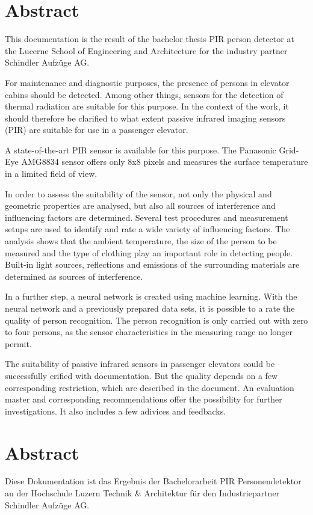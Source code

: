 \chapter*{Abstract}
\label{chap:abstract_englisch}
This documentation is the result of the bachelor thesis PIR person detector at the Lucerne School of Engineering and Architecture for the industry partner Schindler Aufzüge AG.

For maintenance and diagnostic purposes, the presence of persons in elevator cabins should be detected. Among other things, sensors for the detection of thermal radiation are suitable for this purpose. In the context of the work, it should therefore be clarified to what extent passive infrared imaging sensors (PIR) are suitable for use in a passenger elevator. 

A state-of-the-art PIR sensor is available for this purpose. The Panasonic Grid-Eye AMG8834 sensor offers only 8x8 pixels and measures the surface temperature in a limited field of view.  

In order to assess the suitability of the sensor, not only the physical and geometric properties are analysed, but also all sources of interference and influencing factors are determined. Several test procedures and measurement setups are used to identify and rate a wide variety of influencing factors. The analysis shows that the ambient temperature, the size of the person to be measured and the type of clothing play an important role in detecting people. Built-in light sources, reflections and emissions of the surrounding materials are determined as sources of interference.  

In a further step, a neural network is created using machine learning. With the  neural network and a previously prepared data sets, it is possible to a rate the quality of person recognition. The person recognition is only carried out with zero to four persons, as the sensor characteristics in the measuring range no longer permit. 

The suitability of passive infrared sensors in passenger elevators could be successfully erified with documentation. But the quality depends on a few corresponding restriction, which are described in the document. An evaluation master and corresponding recommendations offer the possibility for further investigations. It also includes a few adivices and feedbacks. 


\chapter*{Abstract}
\label{chap:abstract_german}
Diese Dokumentation ist das Ergebnis der Bachelorarbeit {PIR} Personendetektor an der Hochschule Luzern Technik \& Architektur für den Industriepartner Schindler Aufzüge AG. 


